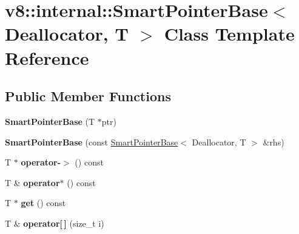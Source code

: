 \hypertarget{classv8_1_1internal_1_1_smart_pointer_base}{}\section{v8\+:\+:internal\+:\+:Smart\+Pointer\+Base$<$ Deallocator, T $>$ Class Template Reference}
\label{classv8_1_1internal_1_1_smart_pointer_base}
\subsection*{Public Member Functions}
\begin{DoxyCompactItemize}
\item 
\hypertarget{classv8_1_1internal_1_1_smart_pointer_base_a4dda24c73c5f49e7b32d664b6347ee60}{}{\bfseries Smart\+Pointer\+Base} (T $\ast$ptr)\label{classv8_1_1internal_1_1_smart_pointer_base_a4dda24c73c5f49e7b32d664b6347ee60}

\item 
\hypertarget{classv8_1_1internal_1_1_smart_pointer_base_ae13f06b548cd8c89d144ac6ef2112d0e}{}{\bfseries Smart\+Pointer\+Base} (const \hyperlink{classv8_1_1internal_1_1_smart_pointer_base}{Smart\+Pointer\+Base}$<$ Deallocator, T $>$ \&rhs)\label{classv8_1_1internal_1_1_smart_pointer_base_ae13f06b548cd8c89d144ac6ef2112d0e}

\item 
\hypertarget{classv8_1_1internal_1_1_smart_pointer_base_a8fbc610e0f5a71acba03a04fd3c46ce8}{}T $\ast$ {\bfseries operator-\/$>$} () const \label{classv8_1_1internal_1_1_smart_pointer_base_a8fbc610e0f5a71acba03a04fd3c46ce8}

\item 
\hypertarget{classv8_1_1internal_1_1_smart_pointer_base_ab93059c3343798490012fd0193f85a6b}{}T \& {\bfseries operator$\ast$} () const \label{classv8_1_1internal_1_1_smart_pointer_base_ab93059c3343798490012fd0193f85a6b}

\item 
\hypertarget{classv8_1_1internal_1_1_smart_pointer_base_add0eb71c35153aa5603907a7979d0a41}{}T $\ast$ {\bfseries get} () const \label{classv8_1_1internal_1_1_smart_pointer_base_add0eb71c35153aa5603907a7979d0a41}

\item 
\hypertarget{classv8_1_1internal_1_1_smart_pointer_base_a60c3ba59698251163f46ef88b83bd619}{}T \& {\bfseries operator\mbox{[}$\,$\mbox{]}} (size\+\_\+t i)\label{classv8_1_1internal_1_1_smart_pointer_base_a60c3ba59698251163f46ef88b83bd619}


\end{DoxyCompactItemize}

